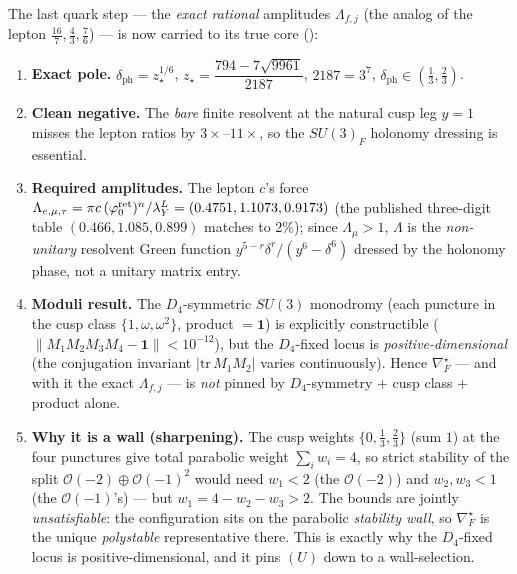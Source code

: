 \begin{keybox}
The last quark step --- the \emph{exact rational} amplitudes $\Lambda_{f,j}$ (the analog of the lepton
$\tfrac{16}{7},\tfrac43,\tfrac76$) --- is now carried to its true core ():
\begin{enumerate}[leftmargin=1.5em,itemsep=1pt]
\item \textbf{Exact pole.} $\delta_{\mathrm{ph}}=z_\star^{1/6}$, $z_\star=\dfrac{794-7\sqrt{9961}}{2187}$,
  $2187=3^7$, $\delta_{\mathrm{ph}}\in(\tfrac13,\tfrac23)$.
\item \textbf{Clean negative.} The \emph{bare} finite resolvent at the natural cusp leg $y{=}1$ misses the
  lepton ratios by $3\times$--$11\times$, so the $SU(3)_F$ holonomy dressing is essential.
\item \textbf{Required amplitudes.} The lepton $c$'s force
  $\Lambda_{e,\mu,\tau}=\pi c\,(\varphi_0^{\mathrm{ret}})^{n}/\lambda_Y^{L}=(0.4751,1.1073,0.9173)$ (the published
  three-digit table $(0.466,1.085,0.899)$ matches to $2\%$); since $\Lambda_\mu{>}1$, $\Lambda$ is the
  \emph{non-unitary} resolvent Green function $y^{5-r}\delta^r/(y^6{-}\delta^6)$ dressed by the holonomy
  phase, not a unitary matrix entry.
\item \textbf{Moduli result.} The $D_4$-symmetric $SU(3)$ monodromy (each puncture in the cusp class
  $\{1,\omega,\omega^2\}$, product $=\mathbf1$) is explicitly constructible ($\|M_1M_2M_3M_4-\mathbf1\|<10^{-12}$),
  but the $D_4$-fixed locus is \emph{positive-dimensional} (the conjugation invariant $|\mathrm{tr}\,M_1M_2|$
  varies continuously). Hence $\nabla_F^\star$ --- and with it the exact $\Lambda_{f,j}$ --- is \emph{not}
  pinned by $D_4$-symmetry $+$ cusp class $+$ product alone.
\item \textbf{Why it is a wall (sharpening).} The cusp weights $\{0,\tfrac13,\tfrac23\}$ (sum $1$) at the
  four punctures give total parabolic weight $\sum_iw_i=4$, so strict stability of the split
  $\mathcal O(-2)\oplus\mathcal O(-1)^2$ would need $w_1{<}2$ (the $\mathcal O(-2)$) and $w_2,w_3{<}1$ (the
  $\mathcal O(-1)$'s) --- but $w_1=4-w_2-w_3>2$. The bounds are jointly \emph{unsatisfiable}: the
  configuration sits on the parabolic \emph{stability wall}, so $\nabla_F^\star$ is the unique
  \emph{polystable} representative there. This is exactly why the $D_4$-fixed locus is positive-dimensional,
  and it pins $(U)$ down to a wall-selection. 
\end{enumerate}

\end{keybox}
